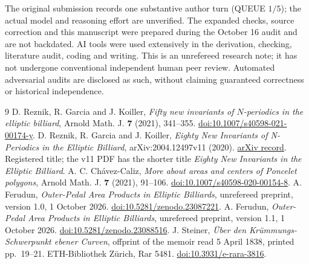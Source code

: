 \documentclass[11pt]{article}
\begin{document}
The original submission records one substantive author turn
(QUEUE \(1/5\)); the actual model and reasoning effort are unverified.
The expanded checks, source correction and this manuscript were prepared
during the October 16 audit and are not backdated.
AI tools were used extensively in the derivation, checking, literature
audit, coding and writing. This is an unrefereed research note; it has
not undergone conventional independent human peer review. Automated
adversarial audits are disclosed as such, without claiming guaranteed
correctness or historical independence.

\begin{thebibliography}{9}
D. Reznik, R. Garcia and J. Koiller,
\emph{Fifty new invariants of \(N\)-periodics in the elliptic billiard},
Arnold Math. J. \textbf{7} (2021), 341--355.
\href{https://doi.org/10.1007/s40598-021-00174-y}{doi:10.1007/s40598-021-00174-y}.
D. Reznik, R. Garcia and J. Koiller,
\emph{Eighty New Invariants of N-Periodics in the Elliptic Billiard},
arXiv:2004.12497v11 (2020).
\href{https://arxiv.org/abs/2004.12497v11}{arXiv record}.
Registered title; the v11 PDF has the shorter title
\emph{Eighty New Invariants in the Elliptic Billiard}.
A. C. Ch\'avez-Caliz,
\emph{More about areas and centers of Poncelet polygons},
Arnold Math. J. \textbf{7} (2021), 91--106.
\href{https://doi.org/10.1007/s40598-020-00154-8}{doi:10.1007/s40598-020-00154-8}.
A. Ferudun, \emph{Outer-Pedal Area Products in Elliptic Billiards},
unrefereed preprint, version 1.0, 1 October 2026.
\href{https://doi.org/10.5281/zenodo.23087221}{doi:10.5281/zenodo.23087221}.
A. Ferudun, \emph{Outer-Pedal Area Products in Elliptic Billiards},
unrefereed preprint, version 1.1, 1 October 2026.
\href{https://doi.org/10.5281/zenodo.23088516}{doi:10.5281/zenodo.23088516}.
J. Steiner, \emph{\"Uber den Kr\"ummungs-Schwerpunkt ebener Curven},
offprint of the memoir read 5 April 1838, printed pp.~19--21.
ETH-Bibliothek Z\"urich, Rar 5481.
\href{https://doi.org/10.3931/e-rara-3816}{doi:10.3931/e-rara-3816}.
\end{thebibliography}
\end{document}

